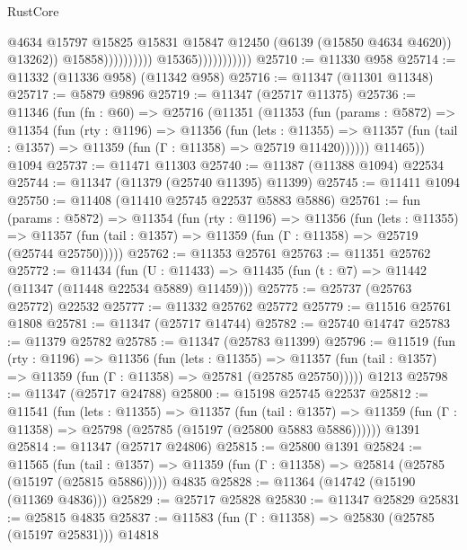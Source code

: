 \begin{lexlean}{RustCore}
\begin{coremodule}
                                                  @4634
                                                  @15797
                                                  @15825
                                                  @15831
                                                  @15847
                                                  @12450
                                                  (@6139 (@15850 @4634 @4620))
                                                  @13262))
                                              @15858))))))))))
                          @15365)))))))))))
@25710 := @11330 @958
@25714 := @11332 (@11336 @958) (@11342 @958)
@25716 := @11347 (@11301 @11348)
@25717 := @5879 @9896
@25719 := @11347 (@25717 @11375)
@25736 := @11346
    (fun (fn : @60) =>
    @25716
      (@11351
        (@11353
          (fun (params : @5872) =>
          @11354
            (fun (rty : @1196) =>
            @11356
              (fun (lets : @11355) =>
              @11357 (fun (tail : @1357) => @11359 (fun (Γ : @11358) => @25719 @11420))))))
        @11465))
    @1094
@25737 := @11471 @11303
@25740 := @11387 (@11388 @1094) @22534
@25744 := @11347 (@11379 (@25740 @11395) @11399)
@25745 := @11411 @1094
@25750 := @11408 (@11410 @25745 @22537 @5883 @5886)
@25761 := fun (params : @5872) =>
  @11354
    (fun (rty : @1196) =>
    @11356
      (fun (lets : @11355) =>
      @11357 (fun (tail : @1357) => @11359 (fun (Γ : @11358) => @25719 (@25744 @25750)))))
@25762 := @11353 @25761
@25763 := @11351 @25762
@25772 := @11434
    (fun (U : @11433) => @11435 (fun (t : @7) => @11442 (@11347 (@11448 @22534 @5889) @11459)))
@25775 := @25737 (@25763 @25772) @22532
@25777 := @11332 @25762 @25772
@25779 := @11516 @25761 @1808
@25781 := @11347 (@25717 @14744)
@25782 := @25740 @14747
@25783 := @11379 @25782
@25785 := @11347 (@25783 @11399)
@25796 := @11519
    (fun (rty : @1196) =>
    @11356
      (fun (lets : @11355) =>
      @11357 (fun (tail : @1357) => @11359 (fun (Γ : @11358) => @25781 (@25785 @25750)))))
    @1213
@25798 := @11347 (@25717 @24788)
@25800 := @15198 @25745 @22537
@25812 := @11541
    (fun (lets : @11355) =>
    @11357
      (fun (tail : @1357) =>
      @11359 (fun (Γ : @11358) => @25798 (@25785 (@15197 (@25800 @5883 @5886))))))
    @1391
@25814 := @11347 (@25717 @24806)
@25815 := @25800 @1391
@25824 := @11565
    (fun (tail : @1357) => @11359 (fun (Γ : @11358) => @25814 (@25785 (@15197 (@25815 @5886)))))
    @4835
@25828 := @11364 (@14742 (@15190 (@11369 @4836)))
@25829 := @25717 @25828
@25830 := @11347 @25829
@25831 := @25815 @4835
@25837 := @11583 (fun (Γ : @11358) => @25830 (@25785 (@15197 @25831))) @14818

\end{coremodule}
\end{lexlean}
